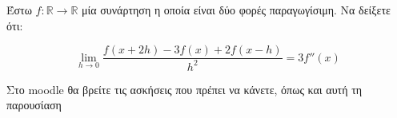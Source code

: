 \documentclass{presentation}
\begin{document}
\begin{askisi}
    Έστω $f:\mathbb{R}\to\mathbb{R}$ μία συνάρτηση η οποία είναι δύο φορές παραγωγίσιμη. Να δείξετε ότι:

    $$\lim\limits_{h \to 0}{ \frac{f(x+2h)-3f(x)+2f(x-h)}{h^2} }=3f''(x)$$
\end{askisi}

\begin{frame}
    Στο moodle θα βρείτε τις ασκήσεις που πρέπει να κάνετε, όπως και αυτή τη παρουσίαση
\end{frame}
\end{document}
